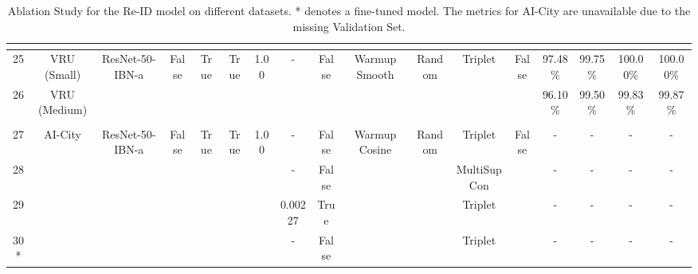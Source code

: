 \begin{table}
{\begin{tabular}{|c|c|c|c|c|c|c|c|c|c|c|c|c|c|c|c|c|}
        \hline
        \multicolumn{17}{c}{\rule{0pt}{4pt}} \\ %
        \hline
        25 & VRU (Small) & \multirow{2}{*}{ResNet-50-IBN-a} & \multirow{2}{*}{False} & \multirow{2}{*}{True} & \multirow{2}{*}{True} & \multirow{2}{*}{1.00} & \multirow{2}{*}{-} & \multirow{2}{*}{False} & \multirow{2}{*}{Warmup Smooth} & \multirow{2}{*}{Random} & \multirow{2}{*}{Triplet} & \multirow{2}{*}{False} & 97.48\% & 99.75\% & 100.00\% & 100.00\% \\
        26 & VRU (Medium) & & & & & & & & & & & & 96.10\% & 99.50\% & 99.83\% & 99.87\% \\
        \hline
        \multicolumn{17}{c}{\rule{0pt}{4pt}} \\ %
        \hline
        27 & \multirow{4}{*}{AI-City} & \multirow{4}{*}{ResNet-50-IBN-a} & \multirow{4}{*}{False} & \multirow{4}{*}{True} & \multirow{4}{*}{True} & \multirow{4}{*}{1.00} & - & False & \multirow{4}{*}{Warmup Cosine} & \multirow{4}{*}{Random} & Triplet & \multirow{4}{*}{False} & - & - & - & - \\
        28 & & & & & & & - & False & & & MultiSupCon & & - & - & - & - \\
        29 & & & & & & & 0.00227 & True & & & Triplet & & - & - & - & - \\
        30* & & & & & & & - & False & & & Triplet & & - & - & - & - \\
        \hline
    \end{tabular}
    } %
    \vspace{0.5cm}
    \caption[ReID Ablation Studies]{Ablation Study for the Re-ID model on different datasets. * denotes a fine-tuned model. The metrics for AI-City are unavailable due to the missing Validation Set.}
    \label{tab:ReIDAblationStudies}
\end{table}

